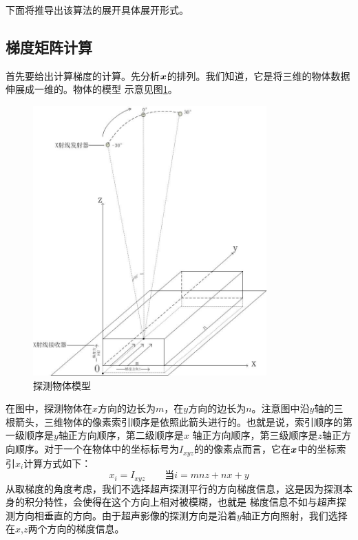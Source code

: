 下面将推导出该算法的展开具体展开形式。


\subsection{梯度矩阵计算}
首先要给出计算梯度的计算。先分析$\bm{ x}$的排列。我们知道，它是将三维的物体数据伸展成一维的。物体的模型
示意见图\ref{fig:model2}。
\begin{figure}[ht]
\center
\includegraphics[width=0.8\textwidth]{figure/model2.jpg}
\caption{探测物体模型}\label{fig:model2}
\end{figure}
在图中，探测物体在$x$方向的边长为$m$，在$y$方向的边长为$n$。注意图中沿$y$轴的三根箭头，三维物体的像素索引顺序是依照此箭头进行的。也就是说，索引顺序的第一级顺序是$y$轴正方向顺序，第二级顺序是$x$
轴正方向顺序，第三级顺序是$z$轴正方向顺序。对于一个在物体中的坐标标号为$I_{xyz}$的的像素点而言，它在$\bm{ x}$中的坐标索引$x_i$计算方式如下：
\begin{equation}\label{eq:indexconvert}
x_i = I_{xyz}\qquad \text{当} i = mnz+nx+y
\end{equation}
从取梯度的角度考虑，我们不选择超声探测平行的方向梯度信息，这是因为探测本身的积分特性，会使得在这个方向上相对被模糊，也就是
梯度信息不如与超声探测方向相垂直的方向。由于超声影像的探测方向是沿着$y$轴正方向照射，我们选择在$x$,$z$两个方向的梯度信息。

